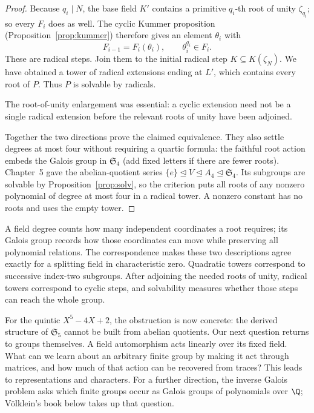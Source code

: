 \begin{proof}
Because $q_i\mid N$, the base field
$K'$ contains a primitive $q_i$-th
root of unity $\zeta_{q_i}$;
so every $F_i$ does as well.
The cyclic Kummer proposition
(Proposition~\ref{prop:kummer})
therefore gives an element $\theta_i$
with
\[
F_{i-1}=F_i(\theta_i),
\qquad \theta_i^{q_i}\in F_i.
\]
These are radical steps.
Join them to the initial radical step
$K\subseteq K(\zeta_N)$.
We have obtained a tower of radical
extensions ending at $L'$, which
contains every root of $P$.
Thus $P$ is solvable by radicals.

The root-of-unity enlargement was
essential: a cyclic extension need
not be a single radical extension
before the relevant roots of unity
have been adjoined.

Together the two directions prove
the claimed equivalence. They also settle degrees at most four without
requiring a quartic formula: the faithful root action embeds the Galois
group in $\mathfrak S_4$ (add fixed letters if there are fewer roots).
Chapter~5 gave the abelian-quotient series
$\{e\}\trianglelefteq V\trianglelefteq A_4\trianglelefteq\mathfrak S_4$.
Its subgroups are solvable by Proposition~\ref{prop:solv}, so the criterion
puts all roots of any nonzero polynomial of degree at most four in a
radical tower. A nonzero constant has no roots and uses the empty tower.
\end{proof}

\begin{beauty}
A field degree counts how many independent coordinates a root requires;
its Galois group records how those coordinates can move while preserving
all polynomial relations. The correspondence makes these two descriptions
agree exactly for a splitting field in characteristic zero. Quadratic
towers correspond to successive index-two subgroups. After adjoining the
needed roots of unity, radical towers correspond to cyclic steps, and
solvability measures whether those steps can reach the whole group.

For the quintic $X^5-4X+2$, the obstruction is now concrete: the derived
structure of $\mathfrak S_5$ cannot be built from abelian quotients.
Our next question returns to groups themselves. A field automorphism acts
linearly over its fixed field. What can we learn about an arbitrary finite
group by making it act through matrices, and how much of that action can
be recovered from traces? This leads to representations and characters. For a further direction, the
inverse Galois problem asks which finite groups occur as Galois groups of
polynomials over $\Q$; Völklein's book below takes up that question.
\end{beauty}

